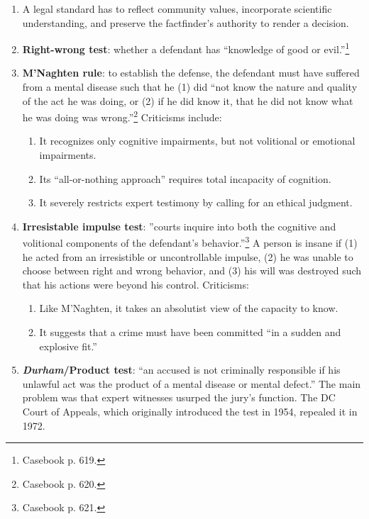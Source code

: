 \begin{enumerate}
    \item A legal standard has to reflect community values, incorporate 
    scientific understanding, and preserve the factfinder's authority to 
    render a decision.
    \item \textbf{Right-wrong test}: whether a defendant has ``knowledge of 
    good or evil.''\footnote{Casebook p. 619.}
    \item \textbf{M'Naghten rule}: to establish the defense, the defendant     
    must have suffered from a mental disease such that he (1) did ``not know 
    the nature and quality of the act he was doing, or (2) if he did know 
    it, that he did not know what he was doing was wrong.''\footnote{Casebook 
    p. 620.} Criticisms include:
    \begin{enumerate}
        \item It recognizes only cognitive impairments, but not volitional or 
        emotional impairments.
        \item Its ``all-or-nothing approach'' requires total incapacity of 
        cognition.
        \item It severely restricts expert testimony by calling for an ethical 
        judgment.
    \end{enumerate}
    \item \textbf{Irresistable impulse test}: ''courts inquire into both the 
    cognitive and volitional components of the defendant's 
    behavior.''\footnote{Casebook p. 621.} A person is insane if (1) he acted 
    from an irresistible or uncontrollable impulse, (2) he was unable to 
    choose between right and wrong behavior, and (3) his will was destroyed 
    such that his actions were beyond his control. Criticisms:
    \begin{enumerate}
        \item Like M'Naghten, it takes an absolutist view of the capacity to 
        know.
        \item It suggests that a crime must have been committed ``in a sudden 
        and explosive fit.''
    \end{enumerate}
    \item \textbf{\emph{Durham}/Product test}: ``an accused is not criminally 
    responsible if his unlawful act was the product of a mental disease or 
    mental defect.'' The main problem was that expert witnesses usurped the 
    jury's function.  The DC Court of Appeals, which originally introduced the 
    test in 1954, repealed it in 1972.

\end{enumerate}
